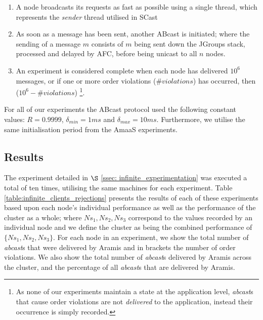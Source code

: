     \begin{enumerate}
        \item    A node broadcasts its requests as fast as possible using a single thread, which represents the \emph{sender} thread utilised in \textsf{SCast}
        
        \item    As soon as a message has been sent, another \textsf{ABcast} is initiated; where the sending of a message $m$ consists of $m$ being sent down the JGroups stack, processed and delayed by AFC, before being unicast to all $n$ nodes.  
        
        \item    An experiment is considered complete when each node has delivered $10^6$ messages, or if one or more order violations ($\#violations$) has occurred, then ($10^6 - \#violations$) \footnote{As none of our experiments maintain a state at the application level, \emph{abcast}s that cause order violations are not \emph{delivered} to the application, instead their occurrence is simply recorded.}.  
    \end{enumerate}
    
    For all of our experiments the \textsf{ABcast} protocol used the following constant values: $R = 0.9999$, $\delta_{min} = 1ms$ and $\delta_{max} = 10ms$.  Furthermore, we utilise the same initialisation period from the \textsf{AmaaS} experiments.  
    
    \subsection{Results}
The experiment detailed in $\S$ \ref{ssec: infinite_experimentation} was executed a total of ten times, utilising the same machines for each experiment.  Table \ref{table:infinite_clients_rejections} presents the results of each of these experiments based upon each node's individual performance as well as the performance of the cluster as a whole; where $Ns_1, Ns_2, Ns_3$ correspond to the values recorded by an individual node and we define the cluster as being the combined performance of $\{Ns_1,Ns_2,Ns_3\}$.  For each node in an experiment, we show the total number of \emph{abcast}s that were delivered by \textsf{Aramis} and in brackets the number of order violations.  We also show the total number of \emph{abcast}s delivered by \textsf{Aramis} across the cluster, and the percentage of all \emph{abcast}s that are delivered by \textsf{Aramis}.  
    
